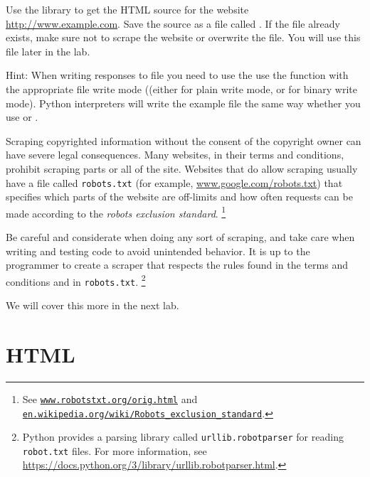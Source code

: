 \begin{problem}
Use the  library to get the HTML source for the website \url{http://www.example.com}.
Save the source as a file called . 
If the file already exists, make sure not to scrape the website or overwrite the file.
You will use this file later in the lab.

Hint: When writing responses to file you need to use the use the  function with the appropriate file write mode ((either  for plain write mode, or  for binary write mode). Python interpreters will write the example file the same way whether you use  or .

\label{prob:get-example.com}
\end{problem}

\begin{warn} %
Scraping copyrighted information without the consent of the copyright owner can have severe legal consequences.
Many websites, in their terms and conditions, prohibit scraping parts or all of the site.
Websites that do allow scraping usually have a file called \texttt{robots.txt} (for example, \url{www.google.com/robots.txt}) that specifies which parts of the website are off-limits and how often requests can be made according to the \emph{robots exclusion standard}.%
\footnote{See \href{http://www.robotstxt.org/orig.html}{\texttt{www.robotstxt.org/orig.html}} and \href{https://en.wikipedia.org/wiki/Robots_exclusion_standard}{\texttt{en.wikipedia.org/wiki/Robots\_exclusion\_standard}}.}

Be careful and considerate when doing any sort of scraping, and take care when writing and testing code to avoid unintended behavior.
It is up to the programmer to create a scraper that respects the rules found in the terms and conditions and in \texttt{robots.txt}.%
\footnote{Python provides a parsing library called \texttt{urllib.robotparser} for reading \texttt{robot.txt} files.
For more information, see \url{https://docs.python.org/3/library/urllib.robotparser.html}.
}

We will cover this more in the next lab.
\end{warn}

\section*{HTML} %

